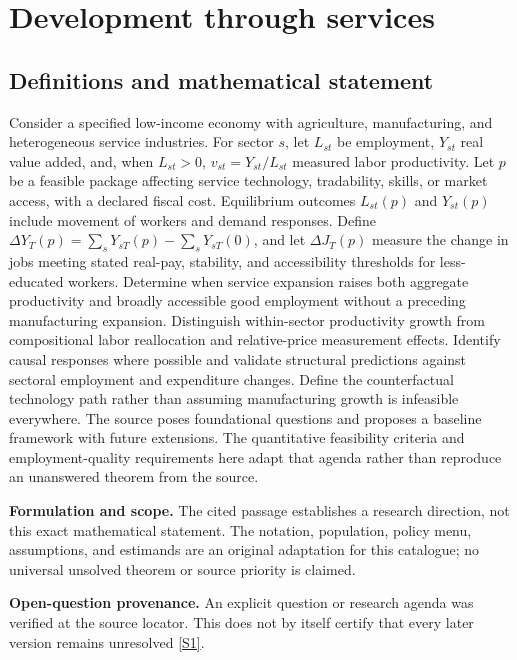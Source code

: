 \documentclass[11pt]{article}
\newcommand{\sref}[2]{\hyperlink{source:#1:#2}{[S#2]}}
\begin{document}
\section*{Development through services}\label{30007660}
\subsection{Definitions and mathematical statement}
Consider a specified low-income economy with agriculture, manufacturing, and heterogeneous service industries. For sector \(s\), let \(L_{st}\) be employment, \(Y_{st}\) real value added, and, when \(L_{st}>0\), \(v_{st}=Y_{st}/L_{st}\) measured labor productivity. Let \(p\) be a feasible package affecting service technology, tradability, skills, or market access, with a declared fiscal cost. Equilibrium outcomes \(L_{st}(p)\) and \(Y_{st}(p)\) include movement of workers and demand responses. Define \(\Delta Y_T(p)=\sum_sY_{sT}(p)-\sum_sY_{sT}(0)\), and let \(\Delta J_T(p)\) measure the change in jobs meeting stated real-pay, stability, and accessibility thresholds for less-educated workers. Determine when service expansion raises both aggregate productivity and broadly accessible good employment without a preceding manufacturing expansion. Distinguish within-sector productivity growth from compositional labor reallocation and relative-price measurement effects. Identify causal responses where possible and validate structural predictions against sectoral employment and expenditure changes. Define the counterfactual technology path rather than assuming manufacturing growth is infeasible everywhere. The source poses foundational questions and proposes a baseline framework with future extensions. The quantitative feasibility criteria and employment-quality requirements here adapt that agenda rather than reproduce an unanswered theorem from the source.

\par\textbf{Formulation and scope.} The cited passage establishes a research direction, not this exact mathematical statement. The notation, population, policy menu, assumptions, and estimands are an original adaptation for this catalogue; no universal unsolved theorem or source priority is claimed.

\par\textbf{Open-question provenance.} An explicit question or research agenda was verified at the source locator. This does not by itself certify that every later version remains unresolved \sref{30007660}{1}.
\end{document}
